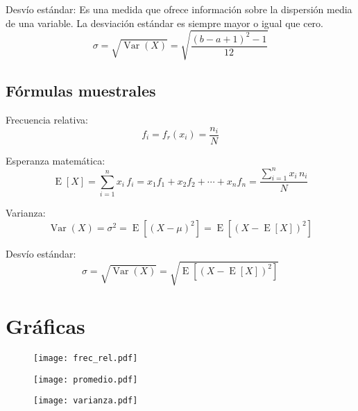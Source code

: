Desvío estándar:
Es una medida que ofrece información sobre la dispersión media de una variable. La desviación estándar es siempre mayor o igual que cero.
\begin{equation}
\sigma = \sqrt{\operatorname{Var}(X)} = \sqrt{\frac{(b-a+1)^{2}-1}{12}}
\end{equation}

\subsection{Fórmulas muestrales}
Frecuencia relativa:
\begin{equation}
f_{i} = f_{r}(x_{i}) = \frac {n_{i}}{N}
\end{equation}

Esperanza matemática:
\begin{equation}
\operatorname{E}[X] = \sum_{i=1}^{n}x_{i}\,f_{i}=x_{1}f_{1}+x_{2}f_{2}+\cdots +x_{n}f_{n} = \frac{\sum_{i=1}^{n}x_{i}\,n_{i}}{N}
\end{equation}

Varianza:
\begin{equation}
\operatorname{Var}(X) = \sigma^{2} = \operatorname{E}\left[(X - \mu)^{2}\right] = \operatorname{E}\left[(X - \operatorname{E}[X])^{2}\right]
\end{equation}

Desvío estándar:
\begin{equation}
\sigma = \sqrt{\operatorname{Var}(X)} = \sqrt{\operatorname{E}\left[(X - \operatorname{E}[X])^{2}\right]}
\end{equation}

\pagebreak  %
\section{Gráficas}
\begin{figure}[H]
  \centering
  \texttt{[image: frec\_rel.pdf]}
  \label{fig:frec_rel}
\end{figure}

\begin{figure}[H]
  \centering
  \texttt{[image: promedio.pdf]}
  \label{fig:promedio}
\end{figure}

\begin{figure}[H]
  \centering
  \texttt{[image: varianza.pdf]}
  \label{fig:varianza}
\end{figure}

